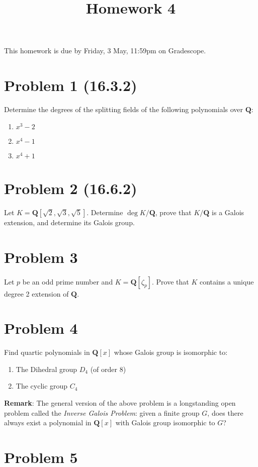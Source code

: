 \documentclass{amsart}
\date{}
\title{Homework 4}
\begin{document}
\maketitle
This homework is due by Friday, 3 May, 11:59pm on Gradescope.
\section{Problem 1  (16.3.2)}
\label{sec:org26015e5}

Determine the degrees of the splitting fields of the following polynomials over \(\mathbf{Q}\):
\begin{enumerate}
\item \(x^3-2\)
\item \(x^4-1\)
\item \(x^4+1\)
\end{enumerate}
\section{Problem 2 (16.6.2)}
\label{sec:orga5581e0}

Let \(K = \mathbf{Q}[\sqrt 2, \sqrt 3, \sqrt 5]\).
Determine \(\deg K / \mathbf{Q}\), prove that \(K/ \mathbf{Q}\) is a Galois extension, and determine its Galois group.
\section{Problem 3}
\label{sec:org1d20a37}

Let \(p\) be an odd prime number and \(K = \mathbf{Q}[\zeta_{p}]\).
Prove that \(K\) contains a unique degree 2 extension of \(\mathbf{Q}\).
\section{Problem 4}
\label{sec:org3e839b2}

Find quartic polynomials in \(\mathbf{Q}[x]\) whose Galois group is isomorphic to:
\begin{enumerate}
\item The Dihedral group \(D_4\) (of order 8)
\item The cyclic group \(C_4\)
\end{enumerate}

\textbf{Remark}: The general version of the above problem is a longstanding open problem called the \emph{Inverse Galois Problem}: given a finite group \(G\), does there always exist a polynomial in \(\mathbf{Q}[x]\) with Galois group isomorphic to \(G\)?
\section{Problem 5}
\label{sec:org5301092}
\end{document}
